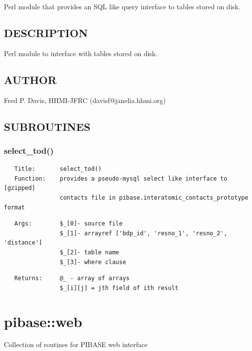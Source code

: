 \documentclass{article}
\begin{document}
Perl module that provides an SQL like query interface to tables stored on disk.

\subsection*{DESCRIPTION\label{pibase::tables_on_disk_DESCRIPTION}}


Perl module to interface with tables stored on disk.

\subsection*{AUTHOR\label{pibase::tables_on_disk_AUTHOR}}


Fred P. Davis, HHMI-JFRC (davisf@janelia.hhmi.org)

\subsection*{SUBROUTINES\label{pibase::tables_on_disk_SUBROUTINES}}
\subsubsection*{select\_tod()\label{pibase::tables_on_disk_select_tod_}}
\begin{verbatim}
   Title:       select_tod()
   Function:    provides a pseudo-mysql select like interface to [gzipped]
                contacts file in pibase.interatomic_contacts_prototype format
\end{verbatim}
\begin{verbatim}
   Args:        $_[0]- source file
                $_[1]- arrayref ['bdp_id', 'resno_1', 'resno_2', 'distance']
                $_[2]- table name
                $_[3]- where clause
\end{verbatim}
\begin{verbatim}
   Returns:     @_ - array of arrays
                $_[i][j] = jth field of ith result
\end{verbatim}
\clearpage
\section{pibase::web\label{pibase::web}}


Collection of routines for PIBASE web interface
\end{document}
